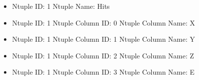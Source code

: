 \documentclass[8pt]{beamer}
\begin{document}
\begin{frame}
\begin{itemize}
        \item Ntuple ID: 1 Ntuple Name: Hits
        
        \item Ntuple ID: 1 Ntuple Column ID: 0 Ntuple Column Name: X
        
        \item Ntuple ID: 1 Ntuple Column ID: 1 Ntuple Column Name: Y
        
        \item Ntuple ID: 1 Ntuple Column ID: 2 Ntuple Column Name: Z
        
        \item Ntuple ID: 1 Ntuple Column ID: 3 Ntuple Column Name: E
        
        \end{itemize}
        
            \end{frame}
            
\end{document}
